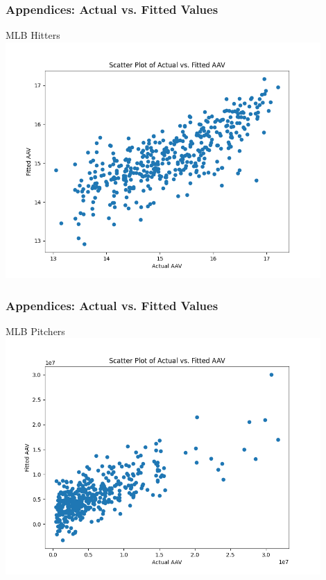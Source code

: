 \documentclass[9pt]{beamer}
\begin{document}
\begin{frame}
    \frametitle{Appendices: Actual vs. Fitted Values}
    \begin{block}{MLB Hitters}
        \centering
        \includegraphics[width=0.9\textwidth,keepaspectratio]{images/mlb_hitters_fitted.png}
    \end{block}
\end{frame}

\begin{frame}
    \frametitle{Appendices: Actual vs. Fitted Values}
    \begin{block}{MLB Pitchers}
        \centering
        \includegraphics[width=0.9\textwidth,keepaspectratio]{images/mlb_pitchers_fitted.png}
    \end{block}
\end{frame}
\end{document}
